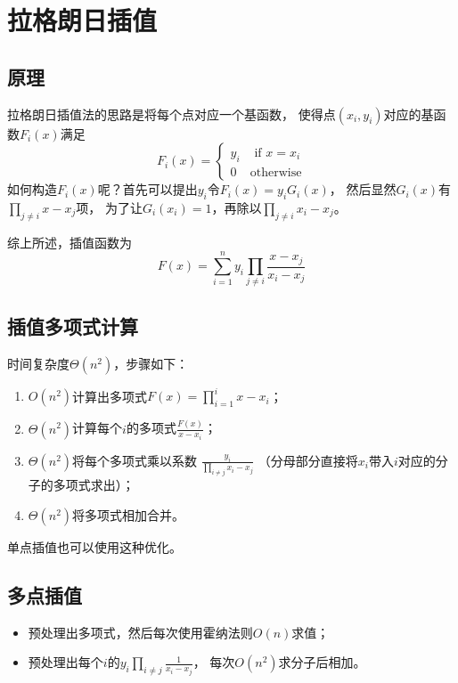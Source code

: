 \section{拉格朗日插值}
\subsection{原理}
拉格朗日插值法的思路是将每个点对应一个基函数，
使得点$(x_i,y_i)$对应的基函数$F_i(x)$满足
\begin{displaymath}
F_i(x)=\left\{\begin{array}{ll}
    y_i& \textrm{~if~$x=x_i$}\\
    0&\textrm{otherwise}
\end{array}\right.
\end{displaymath}
如何构造$F_i(x)$呢？首先可以提出$y_i$令$F_i(x)=y_iG_i(x)$，
然后显然$G_i(x)$有$\displaystyle \prod_{j\neq i}{x-x_j}$项，
为了让$G_i(x_i)=1$，再除以$\displaystyle \prod_{j\neq i}{x_i-x_j}$。

综上所述，插值函数为
\begin{displaymath}
    F(x)=\sum_{i=1}^n{y_i\prod_{j\neq i}{\frac{x-x_j}{x_i-x_j}}}
\end{displaymath}
\subsection{插值多项式计算}
时间复杂度$\Theta(n^2)$，步骤如下：
\begin{enumerate}
    \item $O(n^2)$计算出多项式$\displaystyle F(x)=\prod_{i=1}^i{x-x_i}$；
    \item $\Theta(n^2)$计算每个$i$的多项式$\frac{F(x)}{x-x_i}$；
    \item $\Theta(n^2)$将每个多项式乘以系数
    $\displaystyle \frac{y_i}{\prod_{i\neq j}{x_i-x_j}}$
    （分母部分直接将$x_i$带入$i$对应的分子的多项式求出）；
    \item $\Theta(n^2)$将多项式相加合并。
\end{enumerate}
单点插值也可以使用这种优化。
\subsection{多点插值}
\begin{itemize}
    \item 预处理出多项式，然后每次使用霍纳法则$O(n)$求值；
    \item 预处理出每个$i$的$\displaystyle y_i \prod_{i\neq j}\frac{1}{x_i-x_j}$，
    每次$O(n^2)$求分子后相加。
\end{itemize}
